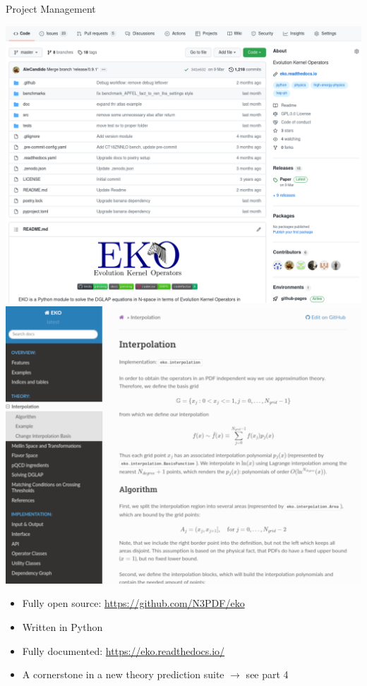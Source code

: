\documentclass[10pt, usepdftitle=false]{beamer}
\begin{document}
\begin{frame}{\eko{} Project Management}
	\begin{center}
		\includegraphics[width=.4\linewidth]{eko-repo.png}%
		\qquad%
		\includegraphics[width=.4\linewidth]{eko-rtd.png}
	\end{center}

	\begin{itemize}
		\item Fully open source: \url{https://github.com/N3PDF/eko}
		\item Written in Python
		\item Fully documented: \url{https://eko.readthedocs.io/}
		\item A cornerstone in a new theory prediction suite $\to$ see part 4
	\end{itemize}
\end{frame}
\end{document}
